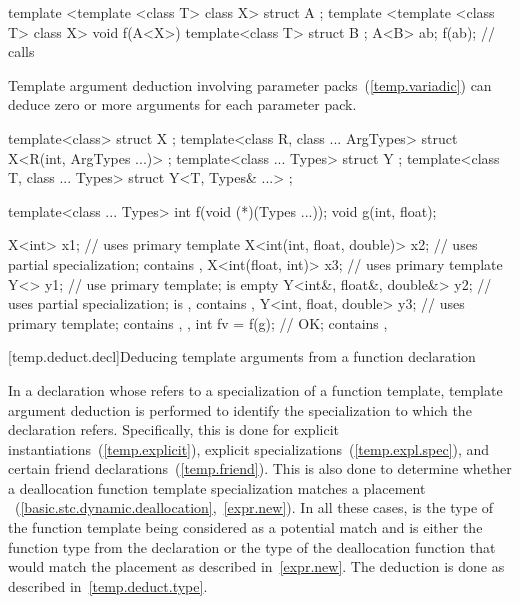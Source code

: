 \begin{codeblock}
template <template <class T> class X> struct A { };
template <template <class T> class X> void f(A<X>) { }
template<class T> struct B { };
A<B> ab;
f(ab);              // calls 
\end{codeblock}
\exitexample

\pnum
\enternote Template argument deduction involving parameter
packs~(\ref{temp.variadic}) can deduce zero or more arguments for
each parameter pack. \exitnote\enterexample

\begin{codeblock}
template<class> struct X { };
template<class R, class ... ArgTypes> struct X<R(int, ArgTypes ...)> { };
template<class ... Types> struct Y { };
template<class T, class ... Types> struct Y<T, Types& ...> { };

template<class ... Types> int f(void (*)(Types ...));
void g(int, float);

X<int> x1;                      // uses primary template
X<int(int, float, double)> x2;  // uses partial specialization;  contains , 
X<int(float, int)> x3;          // uses primary template
Y<> y1;                         // use primary template;  is empty
Y<int&, float&, double&> y2;    // uses partial specialization;  is ,  contains , 
Y<int, float, double> y3;       // uses primary template;  contains , , 
int fv = f(g);                  // OK;  contains , 
\end{codeblock}

\exitexample

[temp.deduct.decl]{Deducing template arguments from a function declaration}

\pnum
In a declaration whose  refers to a specialization
of a function template, template argument deduction is performed to identify
the specialization to which the declaration refers. Specifically, this is done
for explicit instantiations~(\ref{temp.explicit}), explicit specializations~(\ref{temp.expl.spec}),
and certain friend declarations~(\ref{temp.friend}). This is also done to
determine whether a deallocation function template specialization matches a placement
~(\ref{basic.stc.dynamic.deallocation},~\ref{expr.new}).
In all these cases,  is the type of the function template being considered
as a potential match and  is either the function type from the
declaration
or the type of the deallocation function that would match the placement
 as described in~\ref{expr.new}. The
deduction is done as described in~\ref{temp.deduct.type}.

